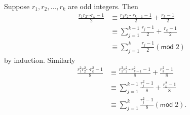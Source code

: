 \documentclass[12pt]{article}
\renewcommand{\pmod}[1]{\left(\mathsf{mod}\;#1\right)}
\begin{document}
\begin{enumerate}
Suppose $r_1,r_2,\ldots,r_k$ are odd integers. Then
\begin{align*}
\frac{r_1r_2\cdots r_k-1}{2}
&\equiv\frac{r_1r_2\cdots r_{k-1}-1}{2}+\frac{r_k-1}{2}\\
&\equiv\sum_{j=1}^{k-1}\frac{r_j-1}{2}+\frac{r_k-1}{2}\\
&\equiv\sum_{j=1}^k\frac{r_j-1}{2}\pmod{2}
\end{align*}
by induction. Similarly
\begin{align*}
\frac{r_1^2r_2^2\cdots r_k^2-1}{8}
&\equiv\frac{r_1^2r_2^2\cdots r_{k-1}^2-1}{8}+\frac{r_k^2-1}{8}\\
&\equiv\sum_{j=1}^{k-1}\frac{r_j^2-1}{8}+\frac{r_k^2-1}{8}\\
&\equiv\sum_{j=1}^k\frac{r_j^2-1}{8}\pmod{2}.
\end{align*}

\end{enumerate}
\end{document}
